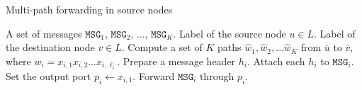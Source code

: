 \begin{algorithm}[htbp]
\caption{Multi-path forwarding in source nodes}
\label{al:fwd_src_multi}
\begin{algorithmic}[1]
	\REQUIRE A set of messages $\texttt{MSG}_1$, $\texttt{MSG}_2$, $\ldots$, $\texttt{MSG}_K$.
    \REQUIRE Label of the source node $u\in L$.
	\REQUIRE Label of the destination node $v\in L$.
	\STATE Compute a set of $K$ paths $\widehat{w}_1, \widehat{w}_2,\ldots\widehat{w}_K$ from $\overline{u}$ to $\overline{v}$, where $w_i=x_{i,1}x_{i,2}\ldots x_{i,\ell_i}$.  
    \STATE Prepare a message header $h_i$. 
    \STATE Attach each $h_i$ to $\texttt{MSG}_i$.
    \STATE Set the output port $p_i\leftarrow x_{i,1}$.
    \STATE Forward $\texttt{MSG}_i$ through $p_i$.
    \ENDFOR
\end{algorithmic}
\end{algorithm}